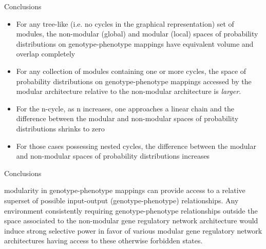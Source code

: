 \begin{frame}
\begin{block}{Conclusions}
\begin{small}
\begin{itemize}
\item For any tree-like (i.e. no cycles in the graphical representation) set of modules, the non-modular (global) and modular (local) spaces of probability distributions on genotype-phenotype mappings have equivalent volume and overlap completely
\item For any collection of modules containing one or more cycles, the space of probability distributions on genotype-phenotype mappings accessed by the modular architecture relative to the non-modular architecture is \emph{larger}.
\item For the n-cycle, as n increases, one approaches a linear chain and the difference between the modular and non-modular spaces of probability distributions shrinks to zero
\item For those cases possessing nested cycles, the difference between the modular and non-modular spaces of probability distributions increases
\end{itemize}
\end{small}
\end{block}
\end{frame}

\begin{frame}
\begin{block}{Conclusions}
\begin{small}
modularity in genotype-phenotype mappings can provide access to a relative superset of possible input-output (genotype-phenotype) relationships. Any environment consistently requiring genotype-phenotype relationships outside the space associated to the non-modular gene regulatory network architecture would induce strong selective power in favor of various modular gene regulatory network architectures having access to these otherwise forbidden states.
\end{small}
\end{block}
\end{frame}
